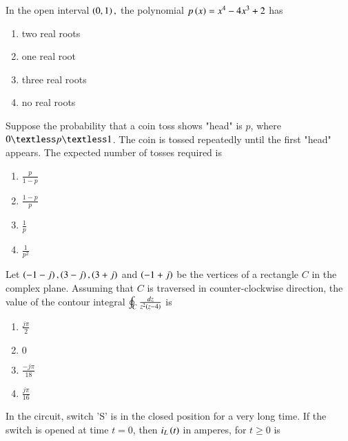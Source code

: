 \documentclass[journal]{IEEEtran}
\begin{document}
\begin{enumerate}
{{\begin{figure}[H]
\label{fig:my_label}
\end{figure}
}
\item{
In the open interval $\left(0,1\right),$ the polynomial $p\left(x\right)=x^4-4x^3+2$ has 
\begin{multicols}{4}
\begin{enumerate}
\item two real roots
\item one real root
\item three real roots
\item no real roots
\end{enumerate}
\end{multicols}
}
\item{
Suppose the probability that a coin toss shows "head" is $p$, where $0\textless p\textless 1$. The coin is tossed repeatedly until the first "head" appears. The expected number of tosses required is
\begin{multicols}{4}
\begin{enumerate}
\item $\frac{p}{1-p}$
\item $\frac{1-p}{p}$
\item $\frac{1}{p}$
\item $\frac{1}{p^2}$
\end{enumerate}
\end{multicols}
}
\item{
Let $\left(-1-j\right),\left(3-j\right),\left(3+j\right)$ and $\left(-1+j\right)$ be the vertices of a rectangle $C$ in the complex plane. Assuming that $C$ is traversed in counter-clockwise direction, the value of the contour integral $\oint_C\frac{dz}{z^2\left(z-4\right)}$ is
\begin{multicols}{4}
\begin{enumerate}
\item $\frac{j\pi}{2}$
\item $0$
\item $\frac{-j\pi}{18}$
\item $\frac{j\pi}{16}$
\end{enumerate}
\end{multicols}
}
\item{
In the circuit, switch 'S' is in the closed position for a very long time. If the switch is opened at time $t=0$, then $i_L\left(t\right)$ in amperes, for $t\geq 0$ is
\begin{figure}[H]
\centering
{}
\end{figure}}}
\end{enumerate}
\end{document}
